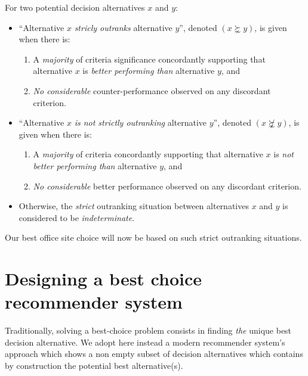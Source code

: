 \begin{definition}\label{def:strictOutranking}

\noindent For two potential decision alternatives $x$ and $y$:
\begin{itemize}[leftmargin=0.5cm,rightmargin=0.5cm]
\item ``Alternative $x$ \emph{stricly outranks} alternative $y$'', denoted $(x \succnsim y)$, is given when there is:
   \begin{enumerate}
     \item A \emph{majority} of criteria significance concordantly supporting that alternative $x$ is \emph{better performing than} alternative $y$, and
     \item \emph{No considerable} counter-performance observed on any discordant criterion.      
    \end{enumerate}
\item ``Alternative $x$ \emph{is not strictly outranking} alternative $y$'', denoted $(x \not\succnsim y)$, is given when there is:
   \begin{enumerate}
    \item A \emph{majority} of criteria concordantly supporting that alternative $x$ is \emph{not better performing than} alternative $y$, and
    \item \emph{No considerable} better performance observed on any discordant criterion. 
    \end{enumerate}
\item Otherwise, the \emph{strict} outranking situation between alternatives $x$ and $y$ is considered to be \emph{indeterminate}.
\end{itemize}
\end{definition}

Our best office site choice will now be based on such strict outranking situations.

\section{Designing a best choice recommender system}
\label{sec:4.3}

Traditionally, solving a best-choice problem consists in finding \emph{the} unique best decision alternative. We adopt here instead a modern recommender system’s approach which shows a non empty subset of decision alternatives which contains by construction the potential best alternative(s).

